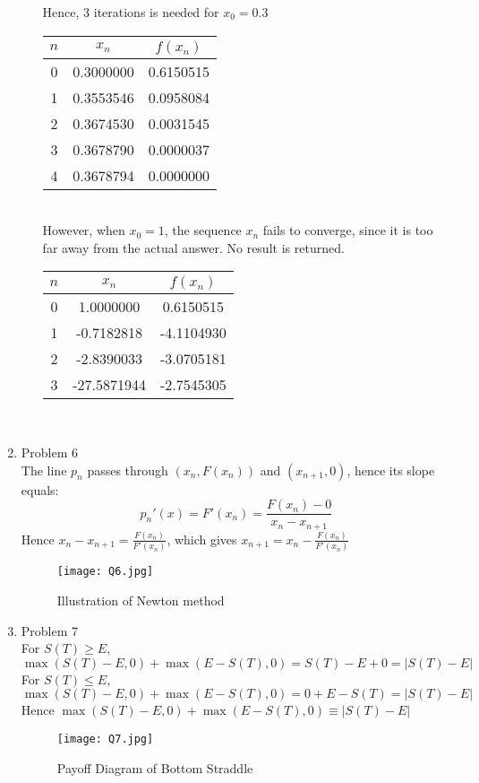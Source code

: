 \documentclass[leqno,12pt]{article}
\begin{document}
\begin{enumerate}
\begin{enumerate}
Hence, 3 iterations is needed for $x_0=0.3$\\
\begin{table}[ht]
\centering
\begin{tabular}{|c|c|c|}
    \hline
    $n$ & $x_n$     & $f(x_n)$ \\ \hline
    0 & 0.3000000 & 0.6150515 \\ \hline
    1 & 0.3553546 & 0.0958084 \\ \hline
    2 & 0.3674530 & 0.0031545 \\ \hline
    3 & 0.3678790 & 0.0000037 \\ \hline
    4 & 0.3678794 & 0.0000000 \\ \hline
\end{tabular}
\end{table}\\
However, when $x_0=1$, the sequence $x_n$ fails to converge, since it is too far away from the actual answer. No result is returned.
\begin{table}[ht]
\centering
\begin{tabular}{|c|c|c|}
    \hline
    $n$ & $x_n$       & $f(x_n)$   \\ \hline
    0 & 1.0000000   & 0.6150515  \\ \hline
    1 & -0.7182818  & -4.1104930 \\ \hline
    2 & -2.8390033  & -3.0705181 \\ \hline
    3 & -27.5871944 & -2.7545305 \\ \hline
\end{tabular}
\end{table}\\
\end{enumerate}

\pagebreak

\item Problem 6\\
The line $p_n$ passes through $(x_n, F(x_n))$ and $(x_{n+1},0)$, hence its slope equals:
\[p_n'(x)=F'(x_n)=\frac{F(x_n)-0}{x_n-x_{n+1}}\]
Hence $x_n-x_{n+1}=\frac{F(x_n)}{F'(x_n)}$, which gives $x_{n+1}=x_n-\frac{F(x_n)}{F'(x_n)}$\\
\begin{figure}[ht]
\centering
\texttt{[image: Q6.jpg]}
\caption{\label{fig:Q6}Illustration of Newton method}
\end{figure}

\pagebreak

\item Problem 7\\
For $S(T)\geq E$, $\max(S(T)-E,0)+\max(E-S(T),0)=S(T)-E+0=|S(T)-E|$\\
For $S(T)\leq E$, $\max(S(T)-E,0)+\max(E-S(T),0)=0+E-S(T)=|S(T)-E|$\\
Hence $\max(S(T)-E,0)+\max(E-S(T),0)\equiv|S(T)-E|$
\begin{figure}[ht]
\centering
\texttt{[image: Q7.jpg]}
\caption{\label{fig:Q7}Payoff Diagram of Bottom Straddle}
\end{figure}


\end{enumerate}
\end{document}
